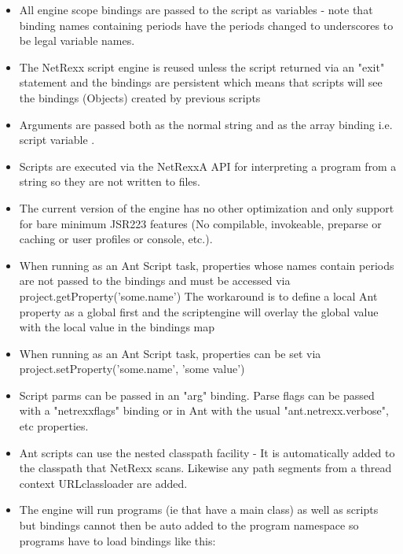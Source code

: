 \begin{itemize}
\item All engine scope bindings are passed to the script as variables - note that binding names containing periods have the periods changed to underscores to be legal variable names.
\item The NetRexx script engine is reused unless the script returned via an "exit" statement and the bindings are persistent which means that scripts will see the bindings (Objects) created by previous scripts
\item Arguments are passed both as the normal  string and as the array binding  i.e. script variable .
\item Scripts are executed via the NetRexxA API for interpreting a program from a string so they are not written to files.
\item The current version of the engine has no other optimization and only support for bare minimum JSR223 features (No compilable, invokeable, preparse or caching or user profiles or console, etc.).
\item When running as an Ant Script task, properties whose names
  contain periods are not passed to the bindings and must be accessed
  via project.getProperty('some.name') The workaround is to define a local Ant property as a global first and the scriptengine will overlay the global value with the local value in the bindings map
\item When running as an Ant Script task, properties can be set via
  project.setProperty('some.name', 'some value')
\item Script parms can be passed in an "arg" binding. Parse flags can be passed with a "netrexxflags" binding or in Ant with the usual "ant.netrexx.verbose", etc properties.
\item Ant scripts can use the nested classpath facility - It is automatically added to the classpath that NetRexx scans. Likewise any path segments from a thread context URLclassloader are added.
\item The engine will run programs (ie that have a main class) as well as scripts but bindings cannot then be auto added to the program namespace so
programs have to load bindings like this: 
\end{itemize}
